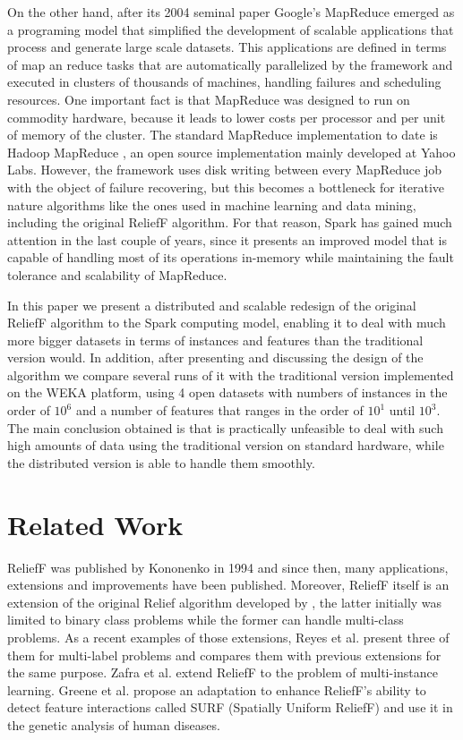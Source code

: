 On the other hand, after its 2004 seminal paper Google's MapReduce \cite{Dean2004a,Dean2008} emerged as a programing model that simplified the development of scalable applications that process and generate large scale datasets. This applications are defined in terms of map an reduce tasks that are automatically parallelized by the framework and executed in clusters of thousands of machines, handling failures and scheduling resources. One important fact is that MapReduce was designed to run on commodity hardware, because it leads to lower costs per processor and per unit of memory of the cluster. The standard MapReduce implementation to date is Hadoop MapReduce \cite{hadoop}, an open source implementation mainly developed at Yahoo Labs. However, the framework uses disk writing between every MapReduce job with the object of failure recovering, but this becomes a bottleneck for iterative nature algorithms like the ones used in machine learning and data mining, including the original ReliefF algorithm. For that reason, Spark \cite{Zaharia2010} has gained much attention in the last couple of years, since it presents an improved model that is capable of handling most of its operations in-memory while maintaining the fault tolerance and scalability of MapReduce.

In this paper we present a distributed and scalable redesign of the original ReliefF algorithm to the Spark computing model, enabling it to deal with much more bigger datasets in terms of instances and features than the traditional version would. In addition, after presenting and discussing the design of the algorithm we compare several runs of it with the traditional version implemented on the WEKA \cite{Hall2009} platform, using 4 open datasets with numbers of instances in the order of $10^6$ and a number of features that ranges in the order of $10^1$ until $10^3$. The main conclusion obtained is that is practically unfeasible to deal with such high amounts of data using the traditional version on standard hardware, while the distributed version is able to handle them smoothly.
\section{Related Work}
\label{sec:relatedWork}
ReliefF was published by Kononenko in 1994 \cite{Kononenko1994} and since then, many applications, extensions and improvements have been published. Moreover, ReliefF itself is an extension of the original Relief algorithm developed by \cite{Kira1992}, the latter initially was limited to binary class problems while the former can handle multi-class problems. As a recent examples of those extensions, Reyes et al. \cite{Reyes2015} present three of them for multi-label problems and compares them with previous extensions for the same purpose. Zafra et al. \cite{Zafra2012} extend ReliefF to the problem of multi-instance learning. Greene et al. \cite{Greene2009} propose an adaptation to enhance ReliefF's ability to detect feature interactions called SURF (Spatially Uniform ReliefF) and use it in the genetic analysis of human diseases.

